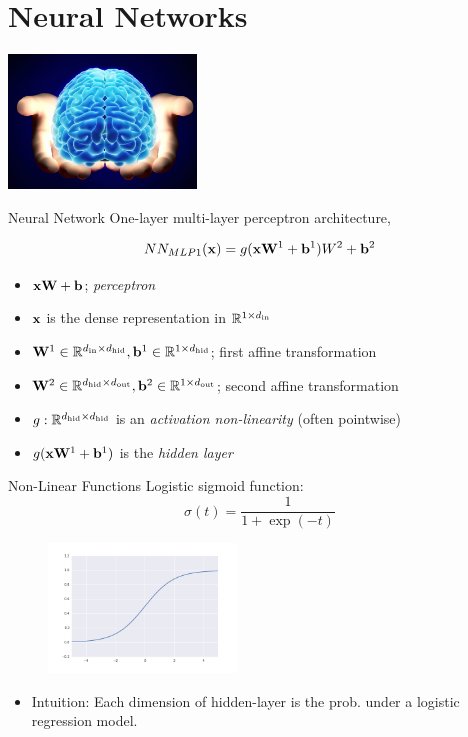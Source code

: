 \documentclass{beamer}
\begin{document}
\section{Neural Networks}

\begin{frame}
  \begin{center}
    \includegraphics[width=5cm]{brain}
  \end{center}
\end{frame}


\begin{frame}{Neural Network}
  One-layer multi-layer perceptron architecture,

  \[NN_{MLP1}(\mathbf{x}) =  g(\mathbf{x}\mathbf{W}^1 + \mathbf{b}^1)W^2 + \mathbf{b}^2\]
  \begin{itemize}
  \item $\mathbf{x}\mathbf{W} + \mathbf{b}$; \textit{perceptron}
  \item $\mathbf{x}$ is the dense representation in $\mathbb{R}^{1 \times {d_{\mathrm{in}}}}$
  \item $\mathbf{W}^1 \in \mathbb{R}^{{d_{\mathrm{in}}} \times {d_{\mathrm{hid}}}}, \mathbf{b}^1 \in \mathbb{R}^{1 \times {d_{\mathrm{hid}}}}$; first affine transformation
  \item $\mathbf{W}^2 \in \mathbb{R}^{{d_{\mathrm{hid}}} \times {d_{\mathrm{out}}}}, \mathbf{b}^2 \in \mathbb{R}^{1 \times {d_{\mathrm{out}}}}$; second affine transformation
  \item $g:\mathbb{R}^{{d_{\mathrm{hid}}} \times {d_{\mathrm{hid}}}}$ is an \textit{activation non-linearity} (often pointwise)
  \item $g(\mathbf{x}\mathbf{W}^1 + \mathbf{b}^1)$ is the \textit{hidden layer}
  \end{itemize}

\end{frame}

\begin{frame}{Non-Linear Functions}
  Logistic sigmoid function:
  \[\sigma(t) = \frac{1}{1 + \exp(-t)} \]
  \begin{figure}
    \centering
    \includegraphics[width=5cm]{../notebooks/sigmoid}
  \end{figure}

  \begin{itemize}
  \item   Intuition: Each dimension of hidden-layer is the prob. under a
  logistic regression model.
  \end{itemize}
\end{frame}
\end{document}
